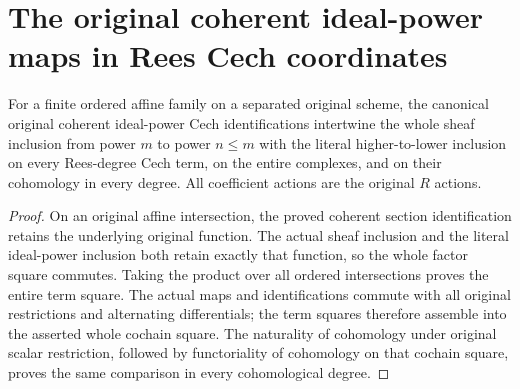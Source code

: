 \section{The original coherent ideal-power maps in Rees Cech coordinates}

\begin{lemma}
\label{lem:fibre-ideal-power-cech-inclusion-comparison}
\leanok
For a finite ordered affine family on a separated original scheme,
the canonical original coherent ideal-power Cech identifications
intertwine the whole sheaf inclusion from power $m$ to power $n\le m$
with the literal higher-to-lower inclusion on every Rees-degree Cech
term, on the entire complexes, and on their cohomology in every degree.
All coefficient actions are the original $R$ actions.
\end{lemma}
\begin{proof}
On an original affine intersection, the proved coherent section
identification retains the underlying original function. The actual
sheaf inclusion and the literal ideal-power inclusion both retain
exactly that function, so the whole factor square commutes. Taking
the product over all ordered intersections proves the entire term
square. The actual maps and identifications commute with all original
restrictions and alternating differentials; the term squares therefore
assemble into the asserted whole cochain square. The naturality of
cohomology under original scalar restriction, followed by functoriality
of cohomology on that cochain square, proves the same comparison in
every cohomological degree.
\end{proof}

